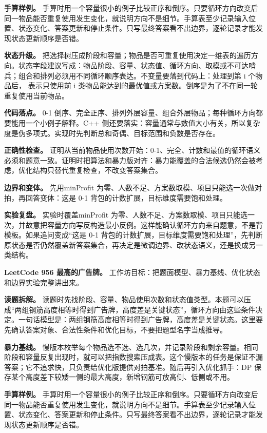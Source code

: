 \textbf{手算样例。} 手算时用一个容量很小的例子比较正序和倒序。只要循环方向改变后同一物品能否重复使用发生变化，就说明方向不是细节。手算表至少记录输入位置、状态变化、答案更新和停止条件。只写最终答案看不出边界，逐轮记录才能发现状态更新顺序是否错。

\textbf{状态升级。} 把选择树压成阶段和容量；物品是否可重复使用决定一维表的遍历方向。状态字段建议写成：物品阶段、容量、状态值、循环方向、取模或不可达哨兵；组合和排列必须用不同循环顺序表达。不变量要落到代码上：处理到第 i 个物品后， 表示只使用前 i 类物品能达到的最优值或方案数。倒序是为了不在同一轮重复使用当前物品。

\textbf{代码落点。} 0-1 倒序、完全正序、排列外层容量、组合外层物品；每种循环方向都要能用一个小例子解释。C++ 侧还要落实：容量通常与数值大小有关，所以复杂度是伪多项式。实现时先判断总和奇偶、目标范围和负数是否存在。

\textbf{正确性检查。} 证明从当前物品使用次数开始：0-1、完全、计数和最值的循环语义必须和题意一致。证明时把算法和暴力版对齐：暴力能覆盖的合法候选仍然会被考虑，优化结构只替代重复检查，不改变答案集合。

\textbf{边界和变体。} 先用minProfit 为零、人数不足、方案数取模、项目只能选一次做对拍，再回答变体：这是 0-1 背包的计数扩展，目标维度需要饱和处理。

\textbf{实验复盘。} 实验时覆盖minProfit 为零、人数不足、方案数取模、项目只能选一次，并故意把容量方向写反构造最小反例。这样能确认循环方向来自题意，不是背模板。如果追问变成“这是 0-1 背包的计数扩展，目标维度需要饱和处理”，先判断原状态是否仍然覆盖新答案集合，再决定是微调边界、改状态语义，还是换成另一类结构。

\noindent\textbf{LeetCode 956 最高的广告牌。} 工作坊目标：把题面模型、暴力基线、优化状态和边界实验完整讲出来。

\textbf{读题拆解。} 读题时先找阶段、容量、物品使用次数和状态值类型。本题可以压成“两组钢筋高度相等时得到广告牌，高度差是关键状态”，循环方向由这些条件决定。一句话模型是：两组钢筋高度相等时得到广告牌，高度差是关键状态。这里要先确认答案对象、合法性条件和优化目标，不要把题型名字当成推导。

\textbf{暴力基线。} 慢版本枚举每个物品选不选、选几次，并记录阶段和剩余容量。相同阶段和容量反复出现时，就可以把指数搜索压成表。这个慢版本的任务是保证不漏答案；它不追求快，只负责给优化版提供对拍基准。随后再引入优化抓手：DP 保存某个高度差下较矮一侧的最大高度，新增钢筋可放高侧、低侧或不用。

\textbf{手算样例。} 手算时用一个容量很小的例子比较正序和倒序。只要循环方向改变后同一物品能否重复使用发生变化，就说明方向不是细节。手算表至少记录输入位置、状态变化、答案更新和停止条件。只写最终答案看不出边界，逐轮记录才能发现状态更新顺序是否错。

